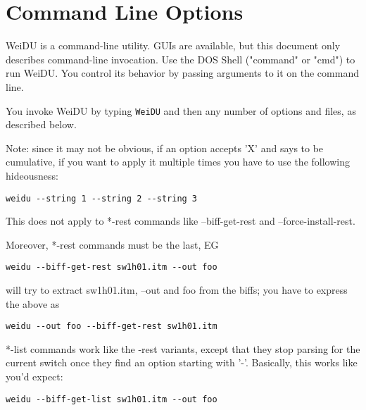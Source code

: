 \documentclass{article}
\begin{document}
\begin{tabular}{cp{10in}|p{10in}}
\\

\end{tabular}

\section{Command Line Options}

WeiDU is a command-line utility. GUIs are available, but this document only
describes command-line invocation. Use the DOS Shell ("command" or "cmd")
to run WeiDU. You control its behavior by passing arguments to it on the
command line. 

You invoke WeiDU by typing {\tt WeiDU} and then any number of options and
files, as described below. 

Note: since it may not be obvious, if an option accepts 'X' and says to be
cumulative, if you want to apply it multiple times you have to use the following
hideousness:
\begin{verbatim}
weidu --string 1 --string 2 --string 3
\end{verbatim}
This does not apply to *-rest commands like --biff-get-rest and --force-install-rest.

Moreover, *-rest commands must be the last, EG
\begin{verbatim}
weidu --biff-get-rest sw1h01.itm --out foo
\end{verbatim}
will try to extract sw1h01.itm, --out and foo from the biffs; you have to express the above as
\begin{verbatim}
weidu --out foo --biff-get-rest sw1h01.itm
\end{verbatim}

*-list commands work like the -rest variants, except that they stop parsing for the current
switch once they find an option starting with '-'. Basically, this works like you'd expect:
\begin{verbatim}
weidu --biff-get-list sw1h01.itm --out foo
\end{verbatim}


\ 
\end{document}
